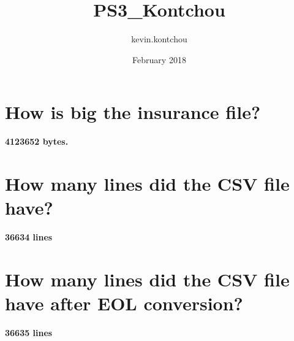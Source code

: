 \documentclass{article}
\title{PS3_Kontchou}
\author{kevin.kontchou }
\date{February 2018}
\begin{document}
\maketitle
\section{How is big the insurance file?}
\textbf{4123652 bytes.}

\section{How many lines did the CSV file have?}
\textbf{36634 lines}

\section{How many lines did the CSV file have after EOL conversion?}
\textbf{36635 lines}
\end{document}
